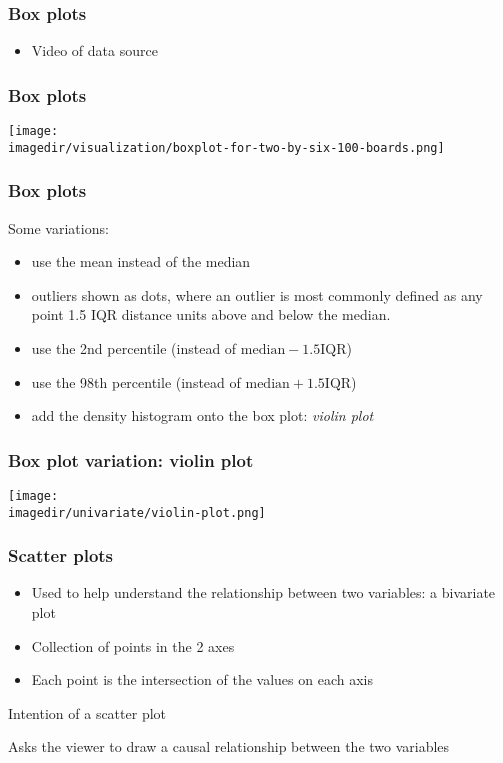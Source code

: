 \begin{frame}\frametitle{Box plots}
	\begin{itemize}
		\item	Video of data source 
	\end{itemize}
\end{frame}

\begin{frame}\frametitle{Box plots}
	\begin{center}
		\texttt{[image: \\imagedir/visualization/boxplot-for-two-by-six-100-boards.png]}
	\end{center}
\end{frame}

\begin{frame}\frametitle{Box plots}
	
	Some variations:
	\begin{itemize}
		\item	use the mean instead of the median 
		\item	outliers shown as dots, where an outlier is most commonly defined as any point 1.5 IQR distance units above and below the median. 
		\item	use the 2nd percentile (instead of $\text{median} - 1.5\text{IQR}$) 
		\item	use the 98th percentile (instead of $\text{median} + 1.5\text{IQR}$) 
		\item	add the density histogram onto the box plot: \emph{violin plot} 
	\end{itemize}
\end{frame}

\begin{frame}\frametitle{Box plot variation: violin plot}
	\begin{center}
		\texttt{[image: \\imagedir/univariate/violin-plot.png]}
	\end{center}
\end{frame}

\begin{frame}\frametitle{Scatter plots}
	\begin{itemize}
		\item	Used to help understand the relationship between two variables: a bivariate plot 
		\item	Collection of points in the 2 axes 
		\item	Each point is the intersection of the values on each axis 
	\end{itemize}
	\begin{block}
		{Intention of a scatter plot} 
		\begin{center}
			Asks the viewer to draw a causal relationship between the two variables 
		\end{center}
	\end{block}
\end{frame}

